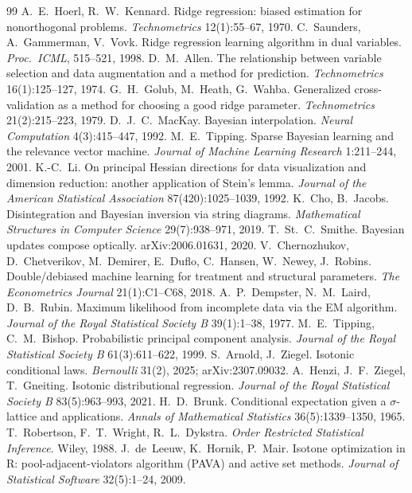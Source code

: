\documentclass[11pt]{article}
\theoremstyle{definition}
\theoremstyle{remark}
\begin{document}
\begin{thebibliography}{99}
 A.~E.~Hoerl, R.~W.~Kennard. Ridge regression: biased estimation for nonorthogonal problems. \emph{Technometrics} 12(1):55--67, 1970.
 C.~Saunders, A.~Gammerman, V.~Vovk. Ridge regression learning algorithm in dual variables. \emph{Proc.\ ICML}, 515--521, 1998.
 D.~M.~Allen. The relationship between variable selection and data augmentation and a method for prediction. \emph{Technometrics} 16(1):125--127, 1974.
 G.~H.~Golub, M.~Heath, G.~Wahba. Generalized cross-validation as a method for choosing a good ridge parameter. \emph{Technometrics} 21(2):215--223, 1979.
 D.~J.~C.~MacKay. Bayesian interpolation. \emph{Neural Computation} 4(3):415--447, 1992.
 M.~E.~Tipping. Sparse Bayesian learning and the relevance vector machine. \emph{Journal of Machine Learning Research} 1:211--244, 2001.
 K.-C.~Li. On principal Hessian directions for data visualization and dimension reduction: another application of Stein's lemma. \emph{Journal of the American Statistical Association} 87(420):1025--1039, 1992.
 K.~Cho, B.~Jacobs. Disintegration and Bayesian inversion via string diagrams. \emph{Mathematical Structures in Computer Science} 29(7):938--971, 2019.
 T.~St.~C.~Smithe. Bayesian updates compose optically. arXiv:2006.01631, 2020.
 V.~Chernozhukov, D.~Chetverikov, M.~Demirer, E.~Duflo, C.~Hansen, W.~Newey, J.~Robins. Double/debiased machine learning for treatment and structural parameters. \emph{The Econometrics Journal} 21(1):C1--C68, 2018.
 A.~P.~Dempster, N.~M.~Laird, D.~B.~Rubin. Maximum likelihood from incomplete data via the EM algorithm. \emph{Journal of the Royal Statistical Society B} 39(1):1--38, 1977.
 M.~E.~Tipping, C.~M.~Bishop. Probabilistic principal component analysis. \emph{Journal of the Royal Statistical Society B} 61(3):611--622, 1999.
 S.~Arnold, J.~Ziegel. Isotonic conditional laws. \emph{Bernoulli} 31(2), 2025; arXiv:2307.09032.
 A.~Henzi, J.~F.~Ziegel, T.~Gneiting. Isotonic distributional regression. \emph{Journal of the Royal Statistical Society B} 83(5):963--993, 2021.
 H.~D.~Brunk. Conditional expectation given a $\sigma$-lattice and applications. \emph{Annals of Mathematical Statistics} 36(5):1339--1350, 1965.
 T.~Robertson, F.~T.~Wright, R.~L.~Dykstra. \emph{Order Restricted Statistical Inference}. Wiley, 1988.
 J.~de~Leeuw, K.~Hornik, P.~Mair. Isotone optimization in R: pool-adjacent-violators algorithm (PAVA) and active set methods. \emph{Journal of Statistical Software} 32(5):1--24, 2009.

\end{thebibliography}
\end{document}
